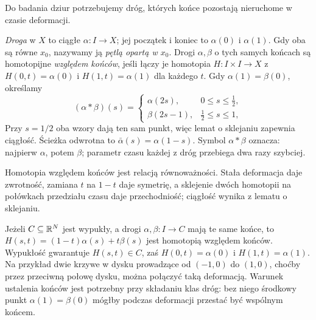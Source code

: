 Do badania dziur potrzebujemy dróg,
których końce pozostają nieruchome w czasie deformacji.

\begin{definicja}
\label{def:droga-petla}
\emph{Droga} w $X$ to ciągłe
$\alpha:I\to X$; jej początek i koniec
to $\alpha(0)$ i $\alpha(1)$.
Gdy oba są równe $x_0$, nazywamy ją
\emph{pętlą opartą w $x_0$}.
Drogi $\alpha,\beta$ o tych samych końcach
są homotopijne \emph{względem końców},
jeśli łączy je homotopia $H:I\times I\to X$
z $H(0,t)=\alpha(0)$ i
$H(1,t)=\alpha(1)$ dla każdego $t$.
Gdy $\alpha(1)=\beta(0)$, określamy
\[
 (\alpha*\beta)(s)=
 \begin{cases}
  \alpha(2s),&0\leq s\leq\tfrac12,\\
  \beta(2s-1),&\tfrac12\leq s\leq1,
 \end{cases}
\]
Przy $s=1/2$ oba wzory dają ten sam punkt,
więc lemat o sklejaniu zapewnia ciągłość.
Ścieżka odwrotna to $\bar\alpha(s)=\alpha(1-s)$.
Symbol $\alpha*\beta$ oznacza: najpierw $\alpha$,
potem $\beta$; parametr czasu każdej z dróg
przebiega dwa razy szybciej.
\end{definicja}

Homotopia względem końców jest relacją równoważności.
Stała deformacja daje zwrotność, zamiana $t$ na $1-t$ daje
symetrię, a sklejenie dwóch homotopii na połówkach przedziału
czasu daje przechodniość; ciągłość wynika z lematu o sklejaniu.

\begin{przyklad}
Jeżeli $C\subseteq\mathbb{R}^N$ jest wypukły, a drogi
$\alpha,\beta:I\to C$ mają te same końce,
to $H(s,t)=(1-t)\alpha(s)+t\beta(s)$ jest homotopią
względem końców. Wypukłość gwarantuje $H(s,t)\in C$,
zaś $H(0,t)=\alpha(0)$ i $H(1,t)=\alpha(1)$.
Na przykład dwie krzywe w dysku prowadzące od
$(-1,0)$ do $(1,0)$, choćby przez przeciwną połowę
dysku, można połączyć taką deformacją.
Warunek ustalenia końców jest potrzebny przy
składaniu klas dróg: bez niego środkowy punkt
$\alpha(1)=\beta(0)$ mógłby podczas deformacji
przestać być wspólnym końcem.
\end{przyklad}

